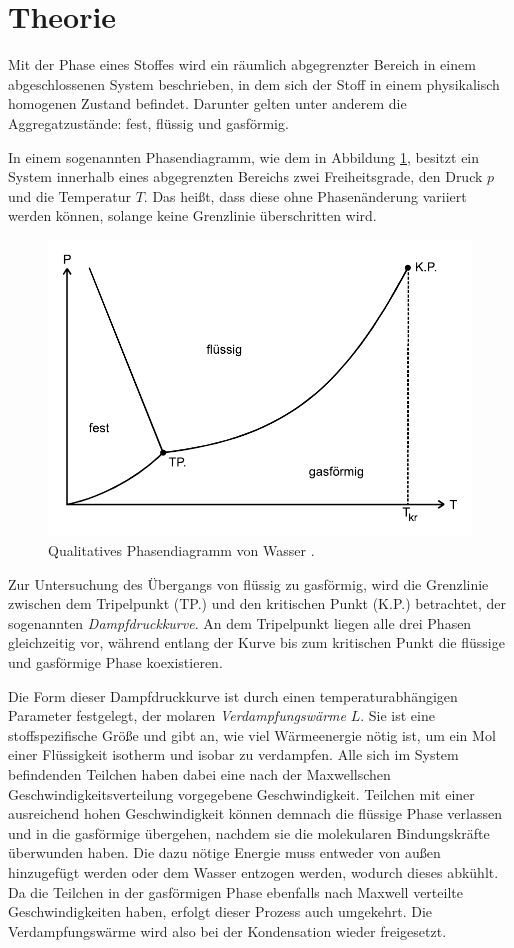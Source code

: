 \section{Theorie}
\label{sec:Theorie}

Mit der Phase eines Stoffes wird ein räumlich abgegrenzter Bereich in einem abgeschlossenen System beschrieben,
in dem sich der Stoff in einem physikalisch homogenen Zustand befindet. 
Darunter gelten unter anderem die Aggregatzustände: fest, flüssig und gasförmig.

In einem sogenannten Phasendiagramm, wie dem in Abbildung \ref{fig:phasendiagramm}, besitzt ein System
innerhalb eines abgegrenzten Bereichs zwei Freiheitsgrade, den Druck $p$ und die Temperatur $T$.
Das heißt, dass diese ohne Phasenänderung variiert werden können, solange keine Grenzlinie überschritten wird.
\begin{figure} 
    \centering
    \includegraphics[width=12cm] {pictures/phasendiagramm.pdf}  
    \caption{Qualitatives Phasendiagramm von Wasser  \cite{v203}.}
    \label{fig:phasendiagramm}
\end{figure}

Zur Untersuchung des Übergangs von flüssig zu gasförmig, wird die Grenzlinie zwischen dem
Tripelpunkt (TP.) und den kritischen Punkt (K.P.) betrachtet, der sogenannten \textit{Dampfdruckkurve}.
An dem Tripelpunkt liegen alle drei Phasen gleichzeitig vor, während entlang der Kurve bis zum
kritischen Punkt die flüssige und gasförmige Phase koexistieren.

Die Form dieser Dampfdruckkurve ist durch einen temperaturabhängigen Parameter festgelegt, 
der molaren \textit{Verdampfungswärme} $L$. 
Sie ist eine stoffspezifische Größe und gibt an, wie viel Wärmeenergie nötig ist, 
um ein Mol einer Flüssigkeit isotherm und isobar zu verdampfen.
Alle sich im System befindenden Teilchen haben dabei eine nach der Maxwellschen Geschwindigkeitsverteilung
vorgegebene Geschwindigkeit. 
Teilchen mit einer ausreichend hohen Geschwindigkeit können demnach die flüssige Phase verlassen und in die
gasförmige übergehen, nachdem sie die molekularen Bindungskräfte überwunden haben.
Die dazu nötige Energie muss entweder von außen hinzugefügt werden oder dem Wasser entzogen werden,
wodurch dieses abkühlt. 
Da die Teilchen in der gasförmigen Phase ebenfalls nach Maxwell verteilte Geschwindigkeiten haben, 
erfolgt dieser Prozess auch umgekehrt. 
Die Verdampfungswärme wird also bei der Kondensation wieder freigesetzt.

